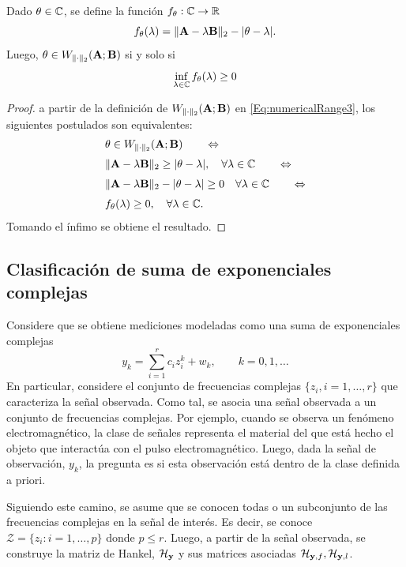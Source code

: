 		\begin{theorem}\label{The:numericalRange}
			Dado $\theta\in\mathbb{C}$, se define la función $f_\theta:\mathbb{C}\to\mathbb{R}$
			\[f_\theta(\lambda) = \|\mathbf{A}-\lambda\mathbf{B}\|_2-|\theta-\lambda|.\]
			Luego, $\theta\in W_{\|\cdot\|_2}(\mathbf{A};\mathbf{B})$ si y solo si
			\[
				\inf_{\lambda\in\mathbb{C}}f_{\theta}(\lambda)\ge 0
			\]
		\end{theorem}
		\begin{proof}
			a partir de la definición de $W_{\|\cdot\|_2}(\mathbf{A};\mathbf{B})$ en \eqref{Eq:numericalRange3}, los siguientes postulados son equivalentes:
			\[\begin{aligned}
				& \theta\in W_{\|\cdot\|_2}(\mathbf{A};\mathbf{B}) \qquad \Leftrightarrow\\[0.3em]
				& \|\mathbf{A} - \lambda\mathbf{B}\|_2\ge|\theta-\lambda|, \quad \forall\lambda\in\mathbb{C}\qquad\Leftrightarrow\\[0.3em]
				&\|\mathbf{A}-\lambda\mathbf{B}\|_2-|\theta-\lambda|\ge 0\quad\forall\lambda\in\mathbb{C}\qquad\Leftrightarrow\\[0.3em]
				&f_{\theta}(\lambda)\ge 0,\quad\forall\lambda\in\mathbb{C}.
			\end{aligned}\] 
			Tomando el ínfimo se obtiene el resultado.
		\end{proof}
		
		\subsection{Clasificación de suma de exponenciales complejas}
		
			Considere que se obtiene mediciones modeladas como una suma de exponenciales complejas
			\begin{equation}
				y_k = \sum_{i=1}^{r}c_iz_i^k + w_k, \qquad k = 0,1,\ldots
				\label{Eq:noisySignal_NR}
			\end{equation}
			En particular, considere el conjunto de frecuencias complejas $\big\{z_i,i=1,\ldots,r\}$ que caracteriza la señal observada. Como tal, se asocia una señal observada a un conjunto de frecuencias complejas. Por ejemplo, cuando se observa un fenómeno electromagnético, la clase de señales representa el material del que está hecho el objeto que interactúa con el pulso electromagnético. Luego, dada la señal de observación, $y_k$, la pregunta es si esta observación está dentro de la clase definida a priori.
			
			Siguiendo este camino, se asume que se conocen todas o un subconjunto de las frecuencias complejas en la señal de interés. Es decir, se conoce $\mathcal{Z} = \big\{z_i:i=1,\ldots,p\big\}$ donde $p\le r$. Luego, a partir de la señal observada, se construye la matriz de Hankel, $\mathcal{H}_{\mathbf{y}}$ y sus matrices asociadas $\mathcal{H}_{\mathbf{y},f},\mathcal{H}_{\mathbf{y},l}$. 
			
